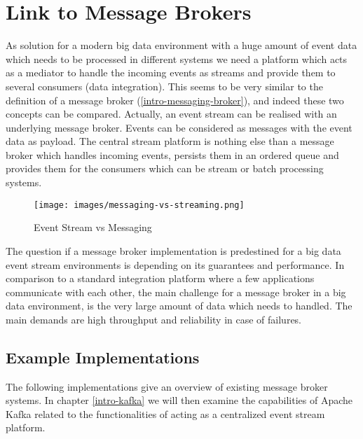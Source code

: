 \newpage
\section{Link to Message Brokers}
As solution for a modern big data environment with a huge amount of event data
which needs to be processed in different systems we need a platform which acts as
a mediator to handle the incoming events as streams and provide them to several
consumers (data integration). This seems to be very similar to
the definition of a message broker (\ref{intro-messaging-broker}), and indeed
these two concepts can be compared. Actually, an event stream can be realised
with an underlying message broker. Events can be considered as messages with the
event data as payload. The central stream platform is nothing else than a
message broker which handles incoming events, persists them in an ordered queue
and provides them for the consumers which can be stream or batch processing
systems.
\begin{figure}[H]
    \centering
    \texttt{[image: images/messaging-vs-streaming.png]}
    \caption{Event Stream vs Messaging}
    \label{fig:messaging-vs-streaming}
\end{figure}
The question if a message broker implementation is predestined for a big data
event stream environments is depending on its guarantees and performance. In
comparison to a standard integration platform where a few applications communicate with each
other, the main challenge for a message broker in a big data environment, is the
very large amount of data which needs to handled. The main demands are high
throughput and reliability in case of failures. 


\subsection{Example Implementations}

The following implementations give an overview of existing message broker systems.
In chapter \ref{intro-kafka} we will then examine the capabilities of Apache
Kafka related to the functionalities of acting as a centralized event stream
platform.

